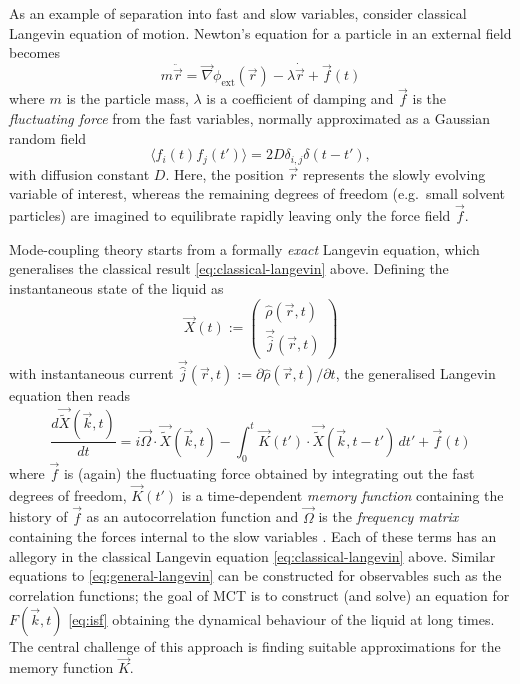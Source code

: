 \documentclass[11pt,twoside]{report}
\begin{document}
As an example of separation into fast and slow variables, consider classical Langevin equation of motion.
Newton's equation for a particle in an external field becomes
\begin{equation}\label{eq:classical-langevin}
  m \ddot{\vec{r}}
  =
  \vec{\nabla} \phi_\mathrm{ext}(\vec{r})
  - \lambda \dot{\vec{r}} + \vec{f}(t)
\end{equation}
where $m$ is the particle mass, $\lambda$ is a coefficient of damping and $\vec{f}$ is the \emph{fluctuating force} from the fast variables, normally approximated as a Gaussian random field
\begin{equation*}
  \langle f_i(t) f_j(t') \rangle = 2 D \delta_{i,j} \delta(t - t'),
\end{equation*}
with diffusion constant $D$.
Here, the position $\vec{r}$ represents the slowly evolving variable of interest, whereas the remaining degrees of freedom (e.g.\ small solvent particles) are imagined to equilibrate rapidly leaving only the force field $\vec{f}$.

Mode-coupling theory starts from a formally \emph{exact} Langevin equation, which generalises the classical result \eqref{eq:classical-langevin} above.
Defining the instantaneous state of the liquid as
\begin{equation*}
  \vec{X}(t) := \begin{pmatrix} \hat\rho(\vec{r}, t) \\ \vec{\hat{j}}(\vec{r}, t) \end{pmatrix}
\end{equation*}
with instantaneous current $\vec{\hat{j}}(\vec{r}, t) := \partial \hat\rho(\vec{r}, t) / \partial t$, the generalised Langevin equation then reads \cite{ReichmanJSM2005, JanssenFP2018}
\begin{equation}\label{eq:general-langevin}
  \frac{d \vec{\widetilde{X}}(\vec{k}, t)}{dt}
  =
  i \vec{\Omega} \cdot \vec{\widetilde{X}}(\vec{k}, t)
  - \int_0^t \vec{K}(t') \cdot \vec{\widetilde{X}}(\vec{k}, t - t') \, dt'
  + \vec{f}(t)
\end{equation}
where $\vec{f}$ is (again) the fluctuating force obtained by integrating out the fast degrees of freedom, $\vec{K}(t')$ is a time-dependent \emph{memory function} containing the history of $\vec{f}$ as an autocorrelation function \cite{ReichmanJSM2005} and $\vec{\Omega}$ is the \emph{frequency matrix} containing the forces internal to the slow variables \cite{JanssenFP2018}.
Each of these terms has an allegory in the classical Langevin equation \eqref{eq:classical-langevin} above.
Similar equations to \eqref{eq:general-langevin} can be constructed for observables such as the correlation functions; the goal of MCT is to construct (and solve) an equation for $F(\vec{k}, t)$ \eqref{eq:isf} obtaining the dynamical behaviour of the liquid at long times.
The central challenge of this approach is finding suitable approximations for the memory function $\vec{K}$.
\end{document}
